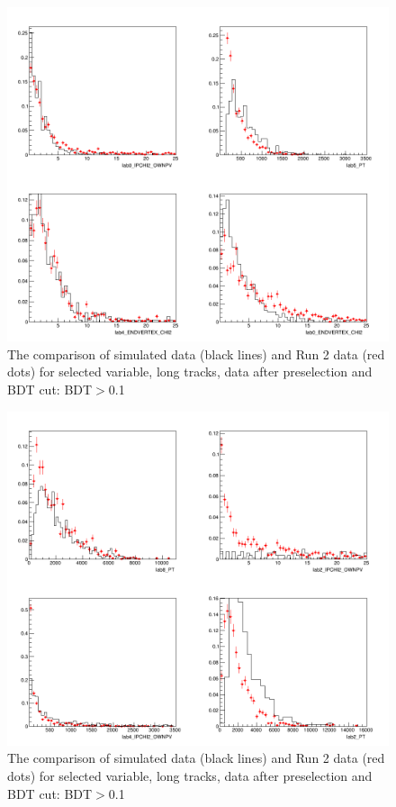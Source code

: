 \begin{figure}[ht]
\includegraphics[width=11.5cm]{figs/MC_Data_Comp/LL1_0.png}
\centering
\caption{The comparison of simulated data (black lines) and Run 2 data (red dots) for selected variable, long tracks, data after preselection and BDT cut: BDT$>$0.1}
\label{fig:MC_Data_Comp_LL1_0}
\end{figure}


\begin{figure}[hb]
\includegraphics[width=11.5cm]{figs/MC_Data_Comp/LL1_1.png}
\centering
\caption{The comparison of simulated data (black lines) and Run 2 data (red dots) for selected variable, long tracks, data after preselection and BDT cut: BDT$>$0.1}
\label{fig:MC_Data_Comp_LL1_1}
\end{figure}


